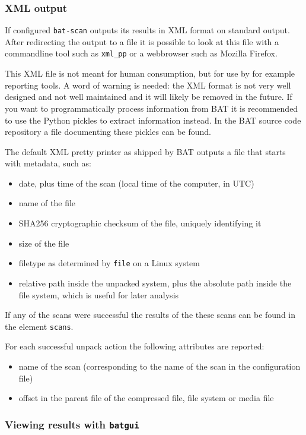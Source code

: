 \documentclass[10pt]{article}
\begin{document}
\subsubsection{XML output}

If configured \texttt{bat-scan} outputs its results in XML format on
standard output. After redirecting the output to a file it is possible to look
at this file with a commandline tool such as \texttt{xml\_pp} or a webbrowser
such as Mozilla Firefox.

This XML file is not meant for human consumption, but for use by for example
reporting tools. A word of warning is needed: the XML format is not very well
designed and not well maintained and it will likely be removed in the future.
If you want to programmatically process information from BAT it is recommended
to use the Python pickles to extract information instead. In the BAT source
code repository a file documenting these pickles can be found.

The default XML pretty printer as shipped by BAT outputs a file that starts
with metadata, such as:

\begin{itemize}
\item date, plus time of the scan (local time of the computer, in UTC)
\item name of the file
\item SHA256 cryptographic checksum of the file, uniquely identifying it
\item size of the file
\item filetype as determined by \texttt{file} on a Linux system
\item relative path inside the unpacked system, plus the absolute path inside
the file system, which is useful for later analysis
\end{itemize}

If any of the scans were successful the results of the these scans can
be found in the element \texttt{scans}.

For each successful unpack action the following attributes are reported:

\begin{itemize}
\item name of the scan (corresponding to the name of the scan in the
configuration file)
\item offset in the parent file of the compressed file, file system or media
file
\end{itemize}

\subsubsection{Viewing results with \texttt{batgui}}
\end{document}
